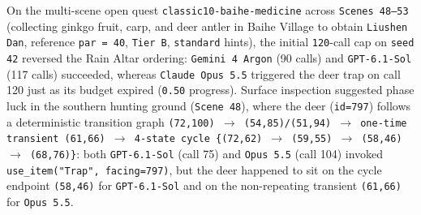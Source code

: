 \documentclass[11pt,a4paper]{article}
\begin{document}
On the multi-scene open quest \texttt{classic10\allowbreak{}-\allowbreak{}baihe\allowbreak{}-\allowbreak{}medicine} across \texttt{Scenes\allowbreak{} \allowbreak{}48--53} (collecting ginkgo fruit, carp, and deer antler in Baihe Village to obtain \texttt{Liushen\allowbreak{} \allowbreak{}Dan}, reference \texttt{par\allowbreak{} \allowbreak{}=\allowbreak{} \allowbreak{}40}, \texttt{Tier\allowbreak{} \allowbreak{}B}, \texttt{standard} hints), the initial \texttt{120}-call cap on \texttt{seed\allowbreak{} \allowbreak{}42} reversed the Rain Altar ordering: \texttt{Gemini\allowbreak{} \allowbreak{}4\allowbreak{} \allowbreak{}Argon} (90 calls) and \texttt{GPT\allowbreak{}-\allowbreak{}6\allowbreak{}.\allowbreak{}1\allowbreak{}-\allowbreak{}Sol} (117 calls) succeeded, whereas \texttt{Claude\allowbreak{} \allowbreak{}Opus\allowbreak{} \allowbreak{}5\allowbreak{}.\allowbreak{}5} triggered the deer trap on call 120 just as its budget expired (\texttt{0\allowbreak{}.\allowbreak{}50} progress). Surface inspection suggested phase luck in the southern hunting ground (\texttt{Scene\allowbreak{} \allowbreak{}48}), where the deer (\texttt{id\allowbreak{}=\allowbreak{}797}) follows a deterministic transition graph \texttt{(72\allowbreak{},\allowbreak{}100)\allowbreak{} \allowbreak{}\ensuremath{\rightarrow}\allowbreak{} \allowbreak{}(54\allowbreak{},\allowbreak{}85)\allowbreak{}/\allowbreak{}(51\allowbreak{},\allowbreak{}94)\allowbreak{} \allowbreak{}\ensuremath{\rightarrow}\allowbreak{} \allowbreak{}one\allowbreak{}-\allowbreak{}time\allowbreak{} \allowbreak{}transient\allowbreak{} \allowbreak{}(61\allowbreak{},\allowbreak{}66)\allowbreak{} \allowbreak{}\ensuremath{\rightarrow}\allowbreak{} \allowbreak{}4\allowbreak{}-\allowbreak{}state\allowbreak{} \allowbreak{}cycle\allowbreak{} \allowbreak{}\{(72\allowbreak{},\allowbreak{}62)\allowbreak{} \allowbreak{}\ensuremath{\rightarrow}\allowbreak{} \allowbreak{}(59\allowbreak{},\allowbreak{}55)\allowbreak{} \allowbreak{}\ensuremath{\rightarrow}\allowbreak{} \allowbreak{}(58\allowbreak{},\allowbreak{}46)\allowbreak{} \allowbreak{}\ensuremath{\rightarrow}\allowbreak{} \allowbreak{}(68\allowbreak{},\allowbreak{}76)\}}: both \texttt{GPT\allowbreak{}-\allowbreak{}6\allowbreak{}.\allowbreak{}1\allowbreak{}-\allowbreak{}Sol} (call 75) and \texttt{Opus\allowbreak{} \allowbreak{}5\allowbreak{}.\allowbreak{}5} (call 104) invoked \texttt{use\allowbreak{}\_\allowbreak{}item("Tr\allowbreak{}ap"\allowbreak{},\allowbreak{} \allowbreak{}facing\allowbreak{}=\allowbreak{}797)}, but the deer happened to sit on the cycle endpoint \texttt{(58\allowbreak{},\allowbreak{}46)} for \texttt{GPT\allowbreak{}-\allowbreak{}6\allowbreak{}.\allowbreak{}1\allowbreak{}-\allowbreak{}Sol} and on the non-repeating transient \texttt{(61\allowbreak{},\allowbreak{}66)} for \texttt{Opus\allowbreak{} \allowbreak{}5\allowbreak{}.\allowbreak{}5}.
\end{document}
